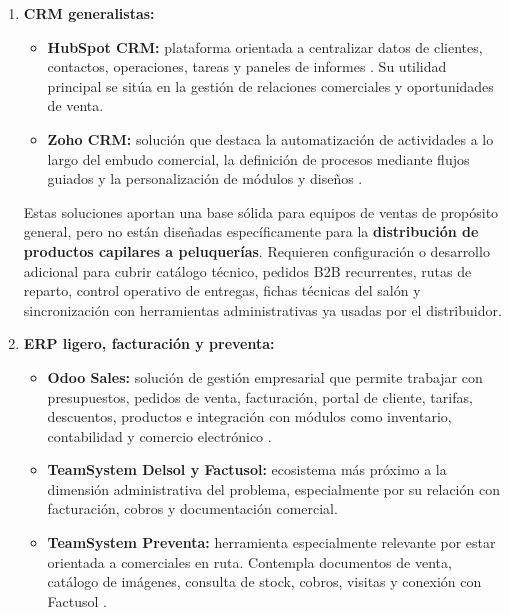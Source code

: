 \begin{enumerate}[label=\textbf{\arabic*.}, leftmargin=1.1cm, itemsep=0.6em, topsep=0.35em]
  \item \textbf{CRM generalistas:}
  \begin{itemize}[topsep=0.1em, itemsep=0.15em]
    \item \textbf{HubSpot CRM:} plataforma orientada a centralizar datos de clientes, contactos, operaciones, tareas y paneles de informes \citep{hubspot-crm}. Su utilidad principal se sitúa en la gestión de relaciones comerciales y oportunidades de venta.
    \item \textbf{Zoho CRM:} solución que destaca la automatización de actividades a lo largo del embudo comercial, la definición de procesos mediante flujos guiados y la personalización de módulos y diseños \citep{zoho-crm-features}.
  \end{itemize}

  Estas soluciones aportan una base sólida para equipos de ventas de propósito general, pero no están diseñadas específicamente para la \textbf{distribución de productos capilares a peluquerías}. Requieren configuración o desarrollo adicional para cubrir catálogo técnico, pedidos B2B recurrentes, rutas de reparto, control operativo de entregas, fichas técnicas del salón y sincronización con herramientas administrativas ya usadas por el distribuidor.

  \item \textbf{ERP ligero, facturación y preventa:}
  \begin{itemize}[topsep=0.1em, itemsep=0.15em]
    \item \textbf{Odoo Sales:} solución de gestión empresarial que permite trabajar con presupuestos, pedidos de venta, facturación, portal de cliente, tarifas, descuentos, productos e integración con módulos como inventario, contabilidad y comercio electrónico \citep{odoo-sales-features}.
    \item \textbf{TeamSystem Delsol y Factusol:} ecosistema más próximo a la dimensión administrativa del problema, especialmente por su relación con facturación, cobros y documentación comercial.
    \item \textbf{TeamSystem Preventa:} herramienta especialmente relevante por estar orientada a comerciales en ruta. Contempla documentos de venta, catálogo de imágenes, consulta de stock, cobros, visitas y conexión con Factusol \citep{sdelsol-preventa}.
  \end{itemize}


\end{enumerate}
